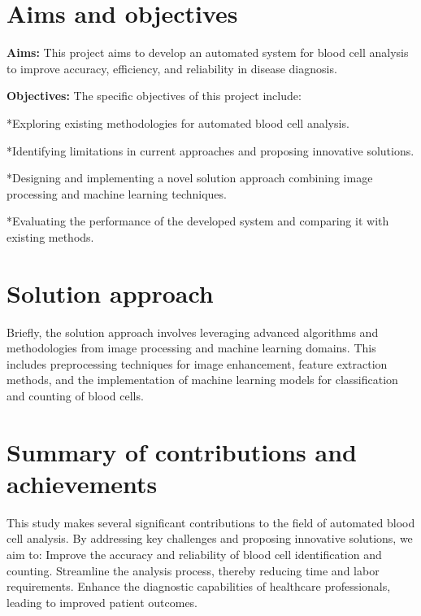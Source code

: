 \section{Aims and objectives}
\label{sec:intro_aims_obj}
\textbf{Aims:} This project aims to develop an automated system for blood cell analysis to improve accuracy, efficiency, and reliability in disease diagnosis.

\textbf{Objectives:} The specific objectives of this project include: 

*Exploring existing methodologies for automated blood cell analysis.

*Identifying limitations in current approaches and proposing innovative solutions. 

*Designing and implementing a novel solution approach combining image processing and machine learning techniques. 

*Evaluating the performance of the developed system and comparing it with existing methods.




\section{Solution approach}
\label{sec:intro_sol} %
Briefly, the solution approach involves leveraging advanced algorithms and methodologies from image processing and machine learning domains. This includes preprocessing techniques for image enhancement, feature extraction methods, and the implementation of machine learning models for classification and counting of blood cells.



\section{Summary of contributions and achievements} %
\label{sec:intro_sum_results} %
 This study makes several significant contributions to the field of automated blood cell analysis. By addressing key challenges and proposing innovative solutions, we aim to: Improve the accuracy and reliability of blood cell identification and counting. Streamline the analysis process, thereby reducing time and labor requirements. Enhance the diagnostic capabilities of healthcare professionals, leading to improved patient outcomes.



